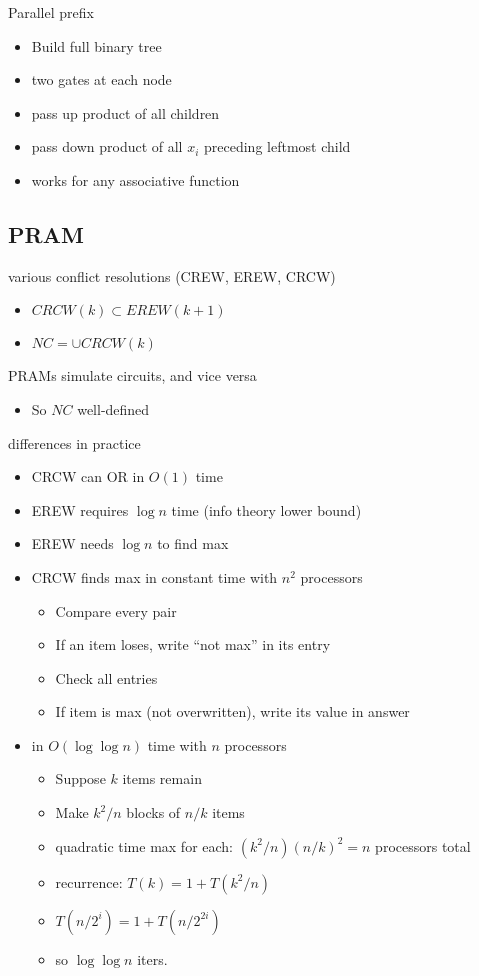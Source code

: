 \documentclass[12pt]{article}
\begin{document}
Parallel prefix
\begin{itemize}
\item Build full binary tree
\item two gates at each node
\item pass up product of all children
\item pass down product of all $x_i$ preceding leftmost child
\item works for any associative function
\end{itemize}


\subsection*{PRAM}

various conflict resolutions (CREW, EREW, CRCW)
\begin{itemize}
\item $CRCW(k) \subset EREW(k+1)$
\item $NC = \cup CRCW(k)$
\end{itemize}

PRAMs simulate circuits, and vice versa
\begin{itemize}
\item So $NC$ well-defined
\end{itemize}

differences in practice
\begin{itemize}
\item CRCW can OR in $O(1)$ time
\item EREW requires $\log n$ time (info theory lower bound)
\item EREW needs $\log n$ to find max
\item CRCW finds max in constant time with $n^2$ processors
\begin{itemize}
\item Compare every pair
\item If an item loses, write ``not max'' in its entry
\item Check all entries
\item If item is max (not overwritten), write its value in answer
\end{itemize}
\item in $O(\log\log n)$ time with $n$ processors
\begin{itemize}
\item Suppose $k$ items remain
\item Make $k^2/n$ blocks of $n/k$ items 
\item quadratic time max for each: $(k^2/n)(n/k)^2=n$ processors total
\item recurrence: $T(k)=1+T(k^2/n)$
\item $T(n/2^i)=1+T(n/2^{2i})$
\item so $\log\log n$ iters.
\end{itemize}
\end{itemize}
\end{document}
